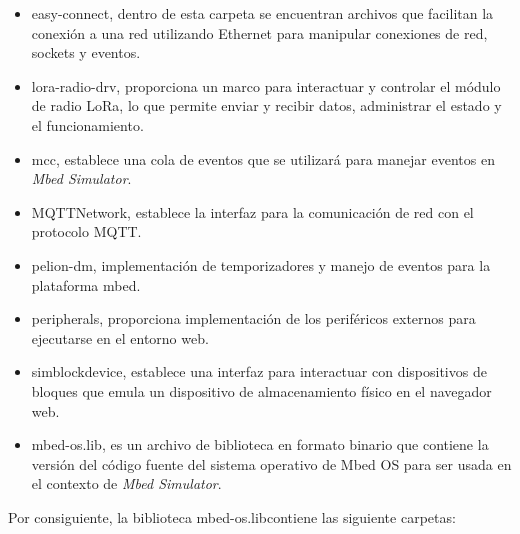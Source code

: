 \begin{itemize}
	\item easy-connect, dentro de esta carpeta se encuentran archivos que facilitan la conexión a una red utilizando Ethernet para manipular conexiones de red, sockets y eventos.
	
	\item lora-radio-drv, proporciona un marco para interactuar y controlar el módulo de radio LoRa, lo que permite enviar y recibir datos, administrar el estado y el funcionamiento.

	\item mcc, establece una cola de eventos que se utilizará para manejar eventos en \textit{Mbed Simulator}. 
	
	\item MQTTNetwork, establece la interfaz para la comunicación de red con el protocolo MQTT. 
	
	\item pelion-dm, implementación de temporizadores y manejo de eventos para la plataforma mbed.
	
	\item peripherals, proporciona implementación de los periféricos externos para ejecutarse en el entorno web.
	
	\item simblockdevice, establece una interfaz para interactuar con  dispositivos de bloques que emula un dispositivo de almacenamiento físico en el navegador web.
	
	\item mbed-os.lib, es un archivo de biblioteca en formato binario que contiene la versión del código fuente del sistema operativo de Mbed OS  para ser usada en el contexto de \textit{Mbed Simulator}.
	
\end{itemize}


Por consiguiente, la biblioteca \textquotedbl mbed-os.lib\textquotedbl contiene las siguiente carpetas: 

